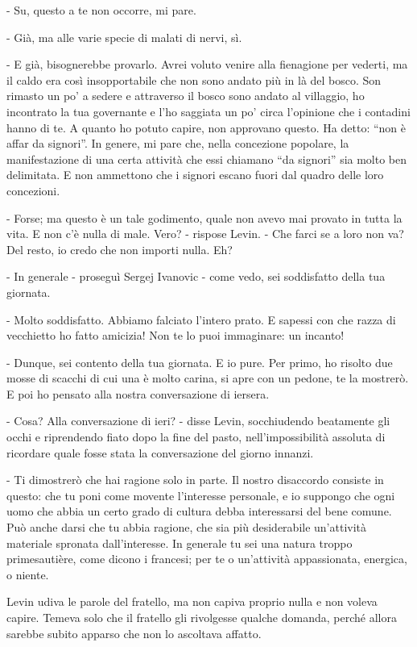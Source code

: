 - Su, questo a te non occorre, mi pare. 

- Già, ma alle varie specie di malati di nervi, sì. 

- E già, bisognerebbe provarlo. Avrei voluto venire alla fienagione per vederti, ma il caldo era così insopportabile che non sono andato più in là del bosco. Son rimasto un po' a sedere e attraverso il bosco sono andato al villaggio, ho incontrato la tua governante e l'ho saggiata un po' circa l'opinione che i contadini hanno di te. A quanto ho potuto capire, non approvano questo. Ha detto: ``non è affar da signori''. In genere, mi pare che, nella concezione popolare, la manifestazione di una certa attività che essi chiamano ``da signori'' sia molto ben delimitata. E non ammettono che i signori escano fuori dal quadro delle loro concezioni. 

- Forse; ma questo è un tale godimento, quale non avevo mai provato in tutta la vita. E non c'è nulla di male. Vero? - rispose Levin. - Che farci se a loro non va? Del resto, io credo che non importi nulla. Eh? 

- In generale - proseguì Sergej Ivanovic - come vedo, sei soddisfatto della tua giornata. 

- Molto soddisfatto. Abbiamo falciato l'intero prato. E sapessi con che razza di vecchietto ho fatto amicizia! Non te lo puoi immaginare: un incanto! 

- Dunque, sei contento della tua giornata. E io pure. Per primo, ho risolto due mosse di scacchi di cui una è molto carina, si apre con un pedone, te la mostrerò. E poi ho pensato alla nostra conversazione di iersera. 

- Cosa? Alla conversazione di ieri? - disse Levin, socchiudendo beatamente gli occhi e riprendendo fiato dopo la fine del pasto, nell'impossibilità assoluta di ricordare quale fosse stata la conversazione del giorno innanzi. 

- Ti dimostrerò che hai ragione solo in parte. Il nostro disaccordo consiste in questo: che tu poni come movente l'interesse personale, e io suppongo che ogni uomo che abbia un certo grado di cultura debba interessarsi del bene comune. Può anche darsi che tu abbia ragione, che sia più desiderabile un'attività materiale spronata dall'interesse. In generale tu sei una natura troppo primesautière, come dicono i francesi; per te o un'attività appassionata, energica, o niente. 

Levin udiva le parole del fratello, ma non capiva proprio nulla e non voleva capire. Temeva solo che il fratello gli rivolgesse qualche domanda, perché allora sarebbe subito apparso che non lo ascoltava affatto. 

